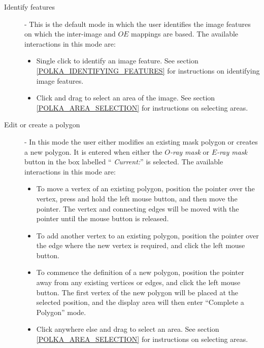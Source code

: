 \documentclass[11pt]{article}
\newcommand{\hyperref}[4]{#2\ref{#4}#3}
\newcommand{\htmlref}[2]{#1}
\newcommand{\xlabel}[1]{}
\newcommand{\mylabel}[1] {\xlabel{#1}\label{#1}}
\begin{document}
\begin{description}

\item [\mylabel{POLKA_MODE_0} Identify features] - This is the default
mode in which the user identifies the image features on which the
inter-image and $OE$ mappings are based. The available interactions in
this mode are:

\begin{itemize}

\item Single click to identify an image feature. \hyperref{Go here}{See
section }{}{POLKA_IDENTIFYING_FEATURES} for instructions on identifying
image features.

\item Click and drag to select an area of the image. \hyperref{Go here}{See
section }{}{POLKA_AREA_SELECTION} for instructions on selecting areas.

\end{itemize}

\item [\mylabel{POLKA_MODE_1} Edit or create a polygon] - In this mode
the user either modifies an existing mask polygon or creates a new
polygon. It is entered when either the \emph{$O$-ray mask} or \emph{$E$-ray
mask} button in the box labelled ``\htmlref{{\em
Current:}}{POLKA_CURRENT}'' is selected. The available interactions in
this mode are:

\begin{itemize}

\item To move a vertex of an existing polygon, position the pointer over
the vertex, press and hold the left mouse button, and then move the
pointer. The vertex and connecting edges will be moved with the pointer
until the mouse button is released.

\item To add another vertex to an existing polygon, position the pointer
over the edge where the new vertex is required, and click the left mouse
button.

\item To commence the definition of a new polygon, position the pointer
away from any existing vertices or edges, and click the left mouse button.
The first vertex of the new polygon will be placed at the selected
position, and the display area will then enter ``\htmlref{Complete a
Polygon}{POLKA_MODE_2}'' mode.

\item Click anywhere else and drag to select an area. \hyperref{Go here}{See
section }{}{POLKA_AREA_SELECTION} for instructions on selecting areas.


\end{itemize}
\end{description}
\end{document}
